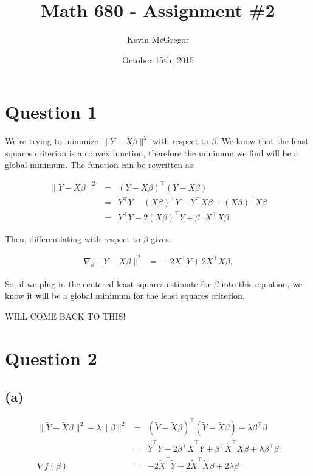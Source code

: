 \documentclass{article}\usepackage[]{graphicx}\usepackage[]{color}
\title{Math 680 - Assignment \#2}
\author{Kevin McGregor}
\date{October 15th, 2015}
\begin{document}
\maketitle

\section*{Question 1}
We're trying to minimize $\|Y-X\beta\|^2$ with respect to $\beta$.  We know that the least squares criterion is a convex function, therefore the minimum we find will be a global minimum.  The function can be rewritten as:

\begin{eqnarray*}
  \|Y-X\beta\|^2 &=& (Y-X\beta)^\top(Y-X\beta) \\
                 &=& Y^\top Y - (X\beta)^\top Y - Y^\top X\beta + (X\beta)^\top X\beta \\
                 &=& Y^\top Y - 2(X\beta)^\top Y + \beta^\top X^\top X\beta.
\end{eqnarray*}

Then, differentiating with respect to $\beta$ gives:

\begin{eqnarray*}
  \nabla_\beta \|Y-X\beta\|^2 &=& -2X^\top Y + 2X^\top X\beta.
\end{eqnarray*}

So, if we plug in the centered least squares estimate for $\beta$ into this equation, we know it will be a global minimum for the least squares criterion.

WILL COME BACK TO THIS!

\section*{Question 2}
\subsection*{(a)}
\begin{eqnarray*}
  \|\tilde{Y}-\tilde{X}\beta\|^2 + \lambda\|\beta\|^2 &=& (\tilde{Y}-\tilde{X}\beta)^\top(\tilde{Y}-\tilde{X}\beta) + \lambda\beta^\top\beta \\
                 &=& \tilde{Y}^\top\tilde{Y} - 2\beta^\top\tilde{X}^\top\tilde{Y} + \beta^\top\tilde{X}^\top\tilde{X}\beta + \lambda\beta^\top\beta \\
 \nabla f(\beta) &=& -2\tilde{X}^\top\tilde{Y} + 2\tilde{X}^\top\tilde{X}\beta + 2\lambda\beta
\end{eqnarray*}
\end{document}
